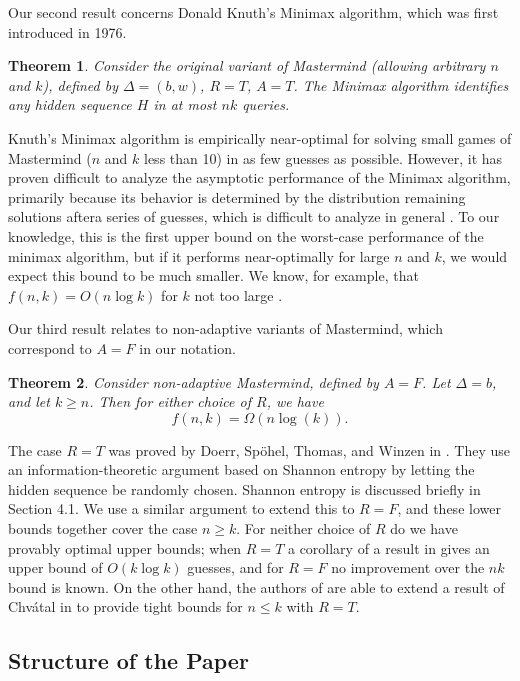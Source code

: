 \documentclass[12pt, a4paper]{article}
\newtheorem{theorem}{Theorem}
\begin{document}
Our second result concerns Donald Knuth's Minimax algorithm, which was first introduced in 1976.
\begin{theorem}\label{minimaxTheorem}
	Consider the original variant of Mastermind (allowing arbitrary $n$ and $k$), defined by $\Delta=(b, w)$, $R=T$, $A=T$. The Minimax algorithm identifies any hidden sequence $H$ in at most $nk$ queries.
\end{theorem}
Knuth's Minimax algorithm is empirically near-optimal for solving small games of Mastermind ($n$ and $k$ less than 10) in as few guesses as possible. However, it has proven difficult to analyze the asymptotic performance of the Minimax algorithm, primarily because its behavior is determined by the distribution remaining solutions aftera series of guesses, which is difficult to analyze in general  \cite{OS13, KT86}. To our knowledge, this is the first upper bound on the worst-case performance of the minimax algorithm, but if it performs near-optimally for large $n$ and $k$, we would expect this bound to be much smaller. We know, for example, that $f(n,k) = O(n \log k)$ for $k$ not too large \cite{DK76, KT86}.

Our third result relates to non-adaptive variants of Mastermind, which correspond to $A=F$ in our notation.
\begin{theorem}\label{nonAdaptiveTheorem}
Consider non-adaptive Mastermind, defined by $A=F$. Let $\Delta = b$, and let $k \geq n$. Then for either choice of $R$, we have
	\begin{equation*}
		f(n, k) = \Omega\left( n\log(k)\right).
	\end{equation*}
\end{theorem}
The case $R = T$ was proved by Doerr, Sp\"ohel, Thomas, and Winzen in \cite{DS13}. They use an information-theoretic argument based on Shannon entropy by letting the hidden sequence be randomly chosen. Shannon entropy is discussed briefly in Section 4.1.
We use a similar argument to extend this to $R = F$, and
these lower bounds together cover the case $n \geq k$. For neither choice of $R$ do we have provably optimal upper bounds; when $R = T$ a corollary of a result in \cite{DS13} gives an upper bound of $O(k \log k)$ guesses, and for $R = F$ no improvement over the $nk$ bound is known. On the other hand, the authors of \cite{DS13} are able to extend a result of Chv\'atal in \cite{VC83} to provide tight bounds for $n \le k$ with $R = T$.
\subsection{Structure of the Paper}
\end{document}
